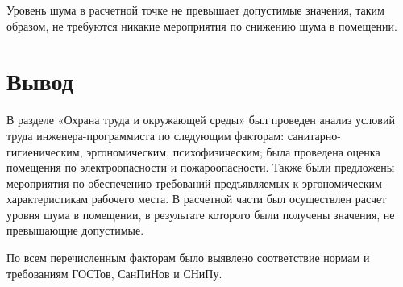 Уровень шума в расчетной точке не превышает допустимые значения, таким образом, не требуются никакие мероприятия по снижению шума в помещении.

\section{Вывод}
В разделе «Охрана труда и окружающей среды» был проведен анализ условий труда инженера-программиста по следующим факторам: санитарно-гигиеническим, эргономическим, психофизическим; была проведена оценка помещения по электроопасности и пожароопасности. Также были предложены мероприятия по обеспечению требований предъявляемых к эргономическим характеристикам рабочего места. В расчетной части был осуществлен расчет уровня шума в помещении, в результате которого были получены значения, не превышающие допустимые.
 
По всем перечисленным факторам было выявлено соответствие нормам и требованиям ГОСТов, СанПиНов и СНиПу.